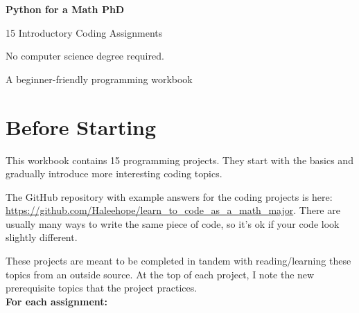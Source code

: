\documentclass[11pt,letterpaper]{article}
\begin{document}
\begin{titlepage}
\centering

\vspace*{1.8cm}

{\Huge\bfseries\color{navy}
Python for a Math PhD\par}

\vspace{0.5cm}

{\Large 15 Introductory Coding Assignments \par}

\vspace{1cm}

\begin{tcolorbox}[
    colback=lightblue,
    colframe=teal,
    width=0.85\textwidth,
    arc=3mm
]
\centering
\large
No computer science degree required.\\[5pt]
\end{tcolorbox}

\vfill

{\large A beginner-friendly programming workbook}

\vspace{1cm}

\end{titlepage}

\section*{Before Starting}

This workbook contains 15 programming projects. They start with the basics and gradually introduce more interesting coding topics. 

The GitHub repository with example answers for the coding projects is here: \url{https://github.com/Haleehope/learn_to_code_as_a_math_major}. There are usually many ways to write the same piece of code, so it's ok if your code look slightly different.

These projects are meant to be completed in tandem with reading/learning these topics from an outside source. At the top of each project, I note the new prerequisite topics that the project practices. \\

\textbf{For each assignment:}
\end{document}
